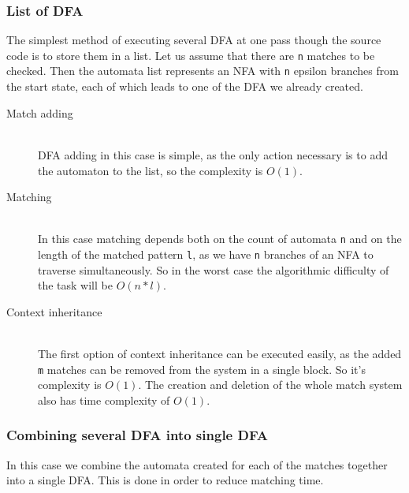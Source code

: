 \subsubsection{List of DFA}
The simplest method of executing several DFA at one pass though the source code
is to store them in a list. Let us assume that there are \verb/n/ matches to be
checked. Then the automata list represents an NFA with \verb/n/ epsilon
branches from the start state, each of which leads to one of the DFA we already
created.

\begin{description}

\item[Match adding] \hfill \\

DFA adding in this case is simple, as the only action necessary is to add the
automaton to the list, so the complexity is $O(1)$.

\item[Matching] \hfill \\

In this case matching depends both on the count of automata \verb/n/ and on the
length of the matched pattern \verb/l/, as we have \verb/n/ branches of an NFA
to traverse simultaneously. So in the worst case the algorithmic difficulty of
the task will be $O(n*l)$.

\item[Context inheritance] \hfill \\

The first option of context inheritance can be executed easily, as the added
\verb/m/ matches can be removed from the system in a single block. So it's
complexity is $O(1)$. The creation and deletion of the whole match system also
has time complexity of $O(1)$.

\end{description}

\subsubsection{Combining several DFA into single DFA}

In this case we combine the automata created for each of the matches together
into a single DFA. This is done in order to reduce matching time. 

